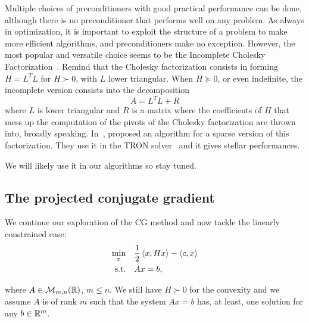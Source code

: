 \documentclass[10pt]{article}
\numberwithin{equation}{section}
\begin{document}
	 Multiple choices of preconditioners with good practical performance can be done, although there is no preconditioner that performs well on any problem. As always in optimization, it is important to exploit the structure of a problem to make more efficient algorithms, and preconditioners make no exception. However, the most popular and versatile choice seems to be the Incomplete Cholesky Factorization~\cite{golubvanloan:2013}. Remind that the Cholesky factorization consists in forming $H=L^TL$ for $H \succ 0$, with $L$ lower triangular. When $H\succeq 0$, or even indefinite, the incomplete version consists into the decomposition
	 \[A = L^TL+R\]
	 where $L$ is lower triangular and $R$ is a matrix where the coefficients of $H$ that mess up the computation of the pivots of the Cholesky factorization are thrown into, broadly speaking. In~\cite{linmore:1999b}, proposed an algorithm for a sparse version of this factorization. They use it in the TRON solver~\cite{linmore:1999a} and it gives stellar performances.
	 
	 We will likely use it in our algorithms so stay tuned.
	 
	\subsection{The projected conjugate gradient}
	 
	 We continue our exploration of the CG method and now tackle the linearly constrained case:
	 \begin{equation}\label{eq:qp_linear_constraints}
	 	\begin{aligned}
	 		\min_x & \quad \dfrac{1}{2} \left\langle {x} , {Hx} \right\rangle - \left\langle {c} , {x} \right\rangle \\
	 	\text{s.t.}	& \quad Ax=b,
	 	\end{aligned}
	 \end{equation}
	 
	 where $A \in {\mathcal{M}}_{m,n}({\mathbb{R}})$, $m\le n$. We still have $H\succ 0$ for the convexity and we assume $A$ is of rank $m$ such that the system $Ax=b$ has, at least, one solution for any $b\in{\mathbb{R}}^m$. 
	 
\end{document}

